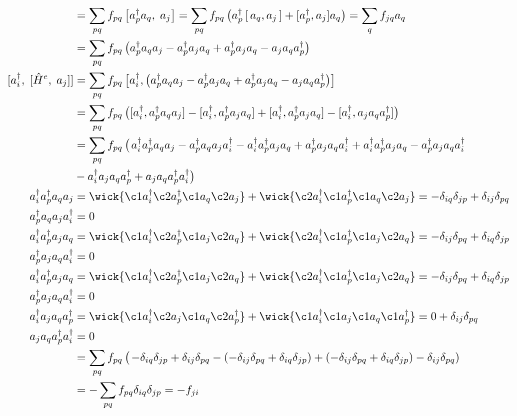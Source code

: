 \begin{align}
[\hat H^e,\;a_j]
&= \sum_{p q}f_{pq}\,\bigl[a_p^\dagger a_q,\;a_j\bigr]
= \sum_{p q}f_{pq}\left(a_p^\dagger\,[\,a_q,a_j\,]+ [a_p^\dagger, a_j] a_q\right) = \sum_q f_{jq} a_q  \\
&= \sum_{p q}f_{pq}\left(a_p^\dagger a_q a_j - a_p^\dagger a_j a_q + a_p^\dagger a_j a_q -  a_j a_q a_p^\dagger \right) \\
[a_i^\dagger,\;[\hat H^e,\;a_j]] &= \sum_{p q}f_{pq}\,\bigl[a_i^\dagger,\left( a_p^\dagger a_q a_j - a_p^\dagger a_j a_q + a_p^\dagger a_j a_q -  a_j a_q a_p^\dagger \right)\bigr] \\
&= \sum_{p q}f_{pq}\,\bigl([a_i^\dagger, a_p^\dagger a_q a_j] - [a_i^\dagger, a_p^\dagger a_j a_q] + [a_i^\dagger, a_p^\dagger a_j a_q] - [a_i^\dagger, a_j a_q a_p^\dagger]\bigr) \\
&= \sum_{p q}f_{pq}\,\bigl( \left. a_i^\dagger a_p^\dagger a_q a_j - a_p^\dagger a_q a_j a_i^\dagger - a_i^\dagger a_p^\dagger a_j a_q + a_p^\dagger a_j a_q a_i^\dagger + a_i^\dagger a_p^\dagger a_j a_q - a_p^\dagger a_j a_q a_i^\dagger \right.\\
&-a_i^\dag a_j a_q a_p^\dagger + a_j a_q a_p^\dagger a_i^\dag \bigr) \\
    a_i^\dagger a_p^\dagger a_q a_j &= \wick{\c1 a_i^\dagger \c2 a_p^\dagger \c1 a_q \c2 a_j} + \wick{\c2 a_i^\dagger \c1 a_p^\dagger \c1 a_q \c2 a_j} = -\delta_{iq} \delta_{jp}+\delta_{ij} \delta_{pq} \\
a_p^\dagger a_q a_j a_i^\dagger &= 0 \\
a_i^\dagger a_p^\dagger a_j a_q &= \wick{\c1 a_i^\dagger \c2 a_p^\dagger \c1 a_j \c2 a_q} + \wick{\c2 a_i^\dagger \c1 a_p^\dagger \c1 a_j \c2 a_q} = -\delta_{ij} \delta_{pq} + \delta_{iq} \delta_{jp} \\
a_p^\dagger a_j a_q a_i^\dagger &= 0 \\
a_i^\dagger a_p^\dagger a_j a_q &= \wick{\c1 a_i^\dagger \c2 a_p^\dagger \c1 a_j \c2 a_q} + \wick{\c2 a_i^\dagger \c1 a_p^\dagger \c1 a_j \c2 a_q} = -\delta_{ij} \delta_{pq} + \delta_{iq} \delta_{jp} \\
a_p^\dagger a_j a_q a_i^\dagger &= 0 \\
a_i^\dag a_j a_q a_p^\dagger &= \wick{\c1 a_i^\dag \c2 a_j \c1 a_q \c2 a_p^\dagger} + \wick{\c1 a_i^\dag \c1 a_j \c1 a_q \c1 a_p^\dagger} = 0 + \delta_{ij} \delta_{pq} \\
a_j a_q a_p^\dagger a_i^\dagger &= 0 \\
&= \sum_{p q}f_{pq}\,\bigl( \left. -\delta_{iq} \delta_{jp}+\delta_{ij} \delta_{pq}  - \left( -\delta_{ij} \delta_{pq} + \delta_{iq} \delta_{jp}\right) + \left(-\delta_{ij} \delta_{pq} + \delta_{iq} \delta_{jp}\right)  - \delta_{ij} \delta_{pq} \right) \\
&= - \sum_{p q}f_{pq} \delta_{iq} \delta_{jp} = - f_{ji} 
\end{align}
